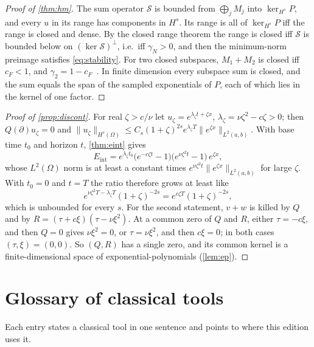 \documentclass[11pt]{article}
\theoremstyle{plain}
\theoremstyle{definition}
\theoremstyle{remark}
\newcommand{\sumop}{\mathcal{S}}            %
\newcommand{\Eint}{E_{\mathrm{int}}}        %
\newcommand{\cF}{c_{F}}                     %
\newcommand{\gN}{\gamma_{N}}                %
\newcommand{\Hs}{H^{s}}                     %
\newcommand{\norm}[1]{\lVert#1\rVert}
\begin{document}
\begin{proof}[Proof of \cref{thm:hm}]
The sum operator $\sumop$ is bounded from $\bigoplus_jM_j$ into $\ker_{\Hs}P$, and every $u$ in its range has
components in $\Hs$. Its range is all of $\ker_{\Hs}P$ iff the range is closed and dense. By the closed range theorem the
range is closed iff $\sumop$ is bounded below on $(\ker\sumop)^\perp$, i.e.\ iff $\gN>0$, and then the minimum-norm
preimage satisfies \eqref{eq:stability}. For two closed subspaces, $M_1+M_2$ is closed iff $\cF<1$, and
$\gamma_2=1-\cF$~\cite{Deu01}. In finite dimension every subspace sum is closed, and the sum equals the span of
the sampled exponentials of $P$, each of which lies in the kernel of one factor.
\end{proof}

\begin{proof}[Proof of \cref{prop:discont}]
For real $\zeta>c/\nu$ let $u_\zeta=e^{\lambda_\zeta t+\zeta x}$, $\lambda_\zeta=\nu\zeta^2-c\zeta>0$; then $Q(\partial)u_\zeta=0$ and
$\norm{u_\zeta}_{\Hs(\Omega)}\le C_s(1+\zeta)^{2s}e^{\lambda_\zeta T}\norm{e^{\zeta x}}_{L^2(a,b)}$. With base time $t_0$ and horizon
$t$, \cref{thm:eint} gives
\[
  \Eint=e^{\lambda_\zeta t_0}\big(e^{-c\zeta t}-1\big)\big(e^{\nu\zeta^2t}-1\big)\,e^{\zeta x},
\]
whose $L^2(\Omega)$ norm is at least a constant times $e^{\nu\zeta^2t}\norm{e^{\zeta x}}_{L^2(a,b)}$ for large $\zeta$. With
$t_0=0$ and $t=T$ the ratio therefore grows at least like
\[
  e^{\nu\zeta^2T-\lambda_\zeta T}(1+\zeta)^{-2s}=e^{c\zeta T}(1+\zeta)^{-2s},
\]
which is unbounded for every $s$. For the second statement, $v+w$ is killed by $Q$ and by
$R=(\tau+c\xi)(\tau-\nu\xi^2)$. At a common zero of $Q$ and $R$, either $\tau=-c\xi$, and then $Q=0$ gives
$\nu\xi^2=0$, or $\tau=\nu\xi^2$, and then $c\xi=0$; in both cases $(\tau,\xi)=(0,0)$. So $(Q,R)$ has a single zero, and
its common kernel is a finite-dimensional space of exponential-polynomials (\cref{lem:ep}).
\end{proof}




\section{Glossary of classical tools}\label{app:gloss}

Each entry states a classical tool in one sentence and points to where this edition uses it.
\end{document}
